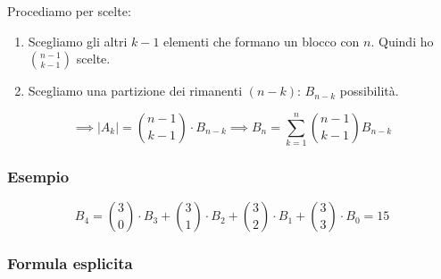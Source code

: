 \documentclass[11pt]{article}
\begin{document}
		Procediamo per scelte:

		\begin{enumerate}
			\item Scegliamo gli altri $k-1$ elementi che formano un blocco
				con $n$. Quindi ho $\binom{n-1}{k-1}$ scelte.
			\item Scegliamo una partizione dei rimanenti $(n-k)$: 
				$B_{n-k}$ possibilit\`a.
		\end{enumerate}
		
		\[
		\implies |A_k| = \binom{n-1}{k-1} \cdot B_{n-k}
		\implies B_n = \sum_{k=1}^{n}\binom{n-1}{k-1}B_{n-k}
	\]

		\subsubsection{Esempio}
		
		\[
			B_4 = \binom{3}{0} \cdot B_3 + \binom{3}{1} \cdot B_2 +
			\binom{3}{2} \cdot B_1 + \binom{3}{3} \cdot B_0 = 15
		\]

		\subsubsection{Formula esplicita}
\end{document}
